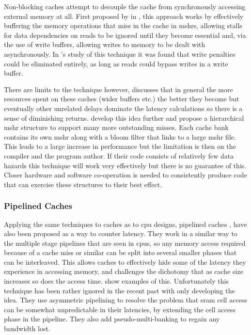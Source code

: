 \label{sec:non-blocking}

Non-blocking caches attempt to decouple the cache from synchronously accessing external memory at all. First proposed by \citet{kroftLockupfreeInstructionFetch1981} in \citeyear{kroftLockupfreeInstructionFetch1981}, this approach works by effectively buffering the memory operations that miss in the cache in \glspl{mshr}, allowing stalls for data dependencies on reads to be ignored until they become essential and, via the use of write buffers, allowing writes to memory to be dealt with asynchronously. In \citet{chenReducingMemoryLatency1992}'s study of this technique it was found that write penalties could be eliminated entirely, as long as reads could bypass writes in a write buffer. 

There are limits to the technique however, \citet{belaynehDiscussionNonblockingLockupfree1996} discusses that in general the more resources spent on these caches (wider buffers etc.) the better they become but eventually other unrelated delays dominate the latency calculations so there is a sense of diminishing returns. \citet{tuckScalableCacheMiss2006} develop this idea further and propose a hierarchical \gls{mshr} structure to support many more outstanding misses. Each cache bank contains its own \gls{mshr} along with a bloom filter that links to a large \gls{mshr} file. This leads to a large increase in performance but the limitation is then on the compiler and the program author. If their code consists of relatively few data hazards this technique will work very effectively but there is no guarantee of this. Closer hardware and software co-operation is needed to consistently produce code that can exercise these structures to their best effect.

\subsubsection{Pipelined Caches}

Applying the same techniques to caches as to \gls{cpu} designs, pipelined caches \cite{olukotunMultilevelOptimizationPipelined1997, olukotunPerformanceOptimizationPipelined1992}, have also been proposed as a way to counter latency. They work in a similar way to the multiple stage pipelines that are seen in \gls{cpu}s, so any memory access required because of a cache miss or similar can be split into several smaller phases that can be interleaved. This allows caches to effectively hide some of the latency they experience in accessing memory, and challenges the dichotomy that as cache size increases so does the access time. \citet{srivastava190MHzCMOS4Kbyte1995, agarwalExploringHighBandwidth2003, martinDesignAsynchronousMIPS1997} show examples of this. Unfortunately this technique has been rather ignored in the recent past with only \citet{hongAVICAAccesstimeVariation2013} developing the idea. They use asymmetric pipelining to resolve the problem that \gls{sram} cell access can be somewhat unpredictable in their latencies, by extending the cell access phase in the pipeline. They also add pseudo-multi-banking to regain any bandwidth lost.


